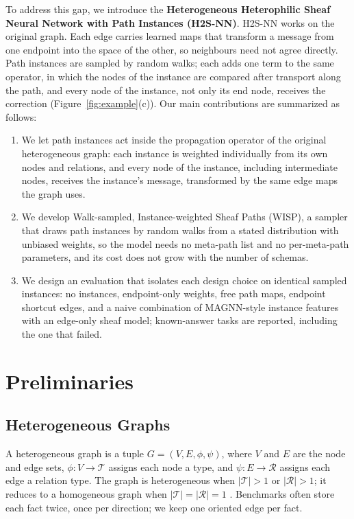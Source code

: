 \documentclass{article}
\newcommand{\method}{\textsc{H2S-NN}}
\newcommand{\wisp}{\textsc{WISP}}
\begin{document}
To address this gap, we introduce the \textbf{Heterogeneous Heterophilic Sheaf Neural Network with Path Instances (\method{})}. \method{} works on the original graph. Each edge carries learned maps that transform a message from one endpoint into the space of the other, so neighbours need not agree directly. Path instances are sampled by random walks; each adds one term to the same operator, in which the nodes of the instance are compared after transport along the path, and every node of the instance, not only its end node, receives the correction (Figure~\ref{fig:example}(c)).
Our main contributions are summarized as follows:
\begin{enumerate}
  \item We let path instances act inside the propagation operator of the original heterogeneous graph: each instance is weighted individually from its own nodes and relations, and every node of the instance, including intermediate nodes, receives the instance's message, transformed by the same edge maps the graph uses.
  \item We develop Walk-sampled, Instance-weighted Sheaf Paths (\wisp{}), a sampler that draws path instances by random walks from a stated distribution with unbiased weights, so the model needs no meta-path list and no per-meta-path parameters, and its cost does not grow with the number of schemas.
  \item We design an evaluation that isolates each design choice on identical sampled instances: no instances, endpoint-only weights, free path maps, endpoint shortcut edges, and a naive combination of MAGNN-style instance features with an edge-only sheaf model; known-answer tasks are reported, including the one that failed.
\end{enumerate}

\section{Preliminaries}
\label{sec:background}

\subsection{Heterogeneous Graphs}
A heterogeneous graph is a tuple $G=(V,E,\phi,\psi)$, where $V$ and $E$ are the node and edge sets, $\phi:V\rightarrow\mathcal{T}$ assigns each node a type, and $\psi:E\rightarrow\mathcal{R}$ assigns each edge a relation type. The graph is heterogeneous when $|\mathcal{T}|>1$ or $|\mathcal{R}|>1$; it reduces to a homogeneous graph when $|\mathcal{T}|=|\mathcal{R}|=1$ \cite{lu2026addressing}. Benchmarks often store each fact twice, once per direction; we keep one oriented edge per fact.
\end{document}
